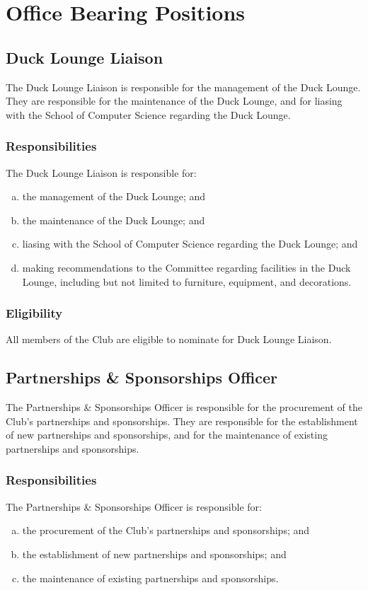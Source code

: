 \documentclass[11pt]{report}
\begin{document}
\chapter{Office Bearing Positions}
\section{Duck Lounge Liaison}
The Duck Lounge Liaison is responsible for the management of the Duck Lounge. They are responsible for the maintenance of the Duck Lounge, and for liasing with the School of Computer Science regarding the Duck Lounge.
\subsection{Responsibilities}
The Duck Lounge Liaison is responsible for:
\begin{enumerate}[(a)]
    \item the management of the Duck Lounge; and
    \item the maintenance of the Duck Lounge; and
    \item liasing with the School of Computer Science regarding the Duck Lounge; and
    \item making recommendations to the Committee regarding facilities in the Duck Lounge, including but not limited to furniture, equipment, and decorations.
\end{enumerate}
\subsection{Eligibility}
All members of the Club are eligible to nominate for Duck Lounge Liaison.

\section{Partnerships \& Sponsorships Officer}
The Partnerships \& Sponsorships Officer is responsible for the procurement of the Club's partnerships and sponsorships. They are responsible for the establishment of new partnerships and sponsorships, and for the maintenance of existing partnerships and sponsorships.
\subsection{Responsibilities}
The Partnerships \& Sponsorships Officer is responsible for:
\begin{enumerate}[(a)]
    \item the procurement of the Club's partnerships and sponsorships; and
    \item the establishment of new partnerships and sponsorships; and
    \item the maintenance of existing partnerships and sponsorships.
\end{enumerate}
\end{document}
